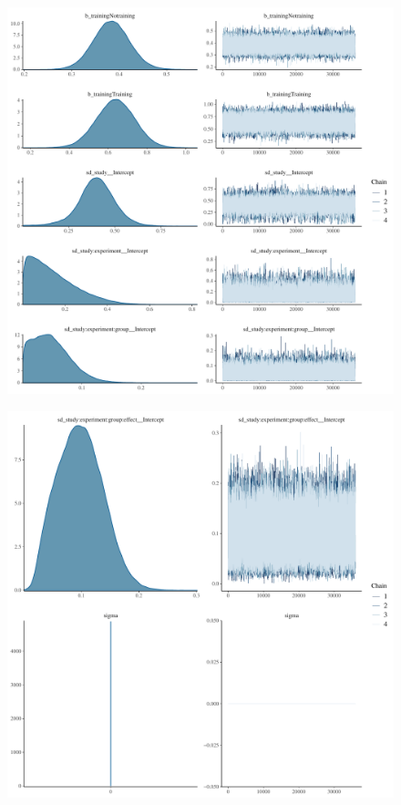 \documentclass[
]{report}
\begin{document}
\begin{figure}

{\centering \includegraphics[width=1\textwidth,height=\textheight]{diagnostic_plots_files/figure-pdf/unnamed-chunk-26-1.pdf}

}

\end{figure}

\begin{figure}

{\centering \includegraphics[width=1\textwidth,height=\textheight]{diagnostic_plots_files/figure-pdf/unnamed-chunk-26-2.pdf}

}

\end{figure}
\end{document}
